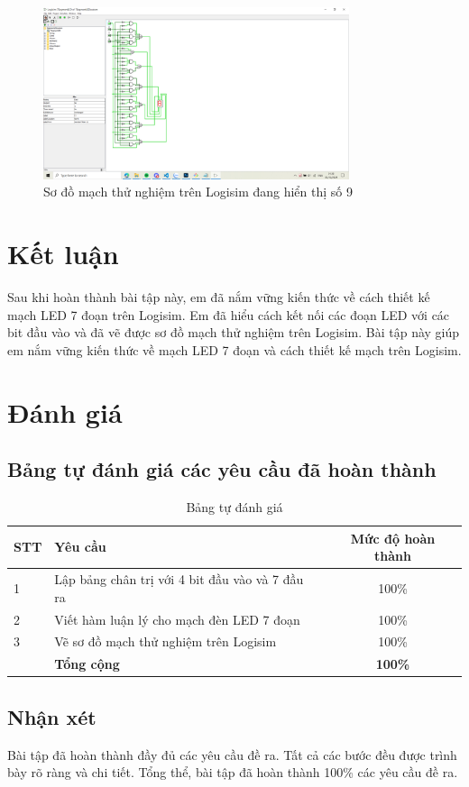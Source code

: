 \begin{figure}[H]
	\centering
	\includegraphics[width=0.8\textwidth]{images/9.PNG}
	\caption{Sơ đồ mạch thử nghiệm trên Logisim đang hiển thị số 9}
	\label{fig:circuitDesign}
\end{figure}

\section{Kết luận}

Sau khi hoàn thành bài tập này, em đã nắm vững kiến thức về cách thiết kế mạch LED 7 đoạn trên Logisim. Em đã hiểu cách kết nối các đoạn LED với các bit đầu vào và đã vẽ được sơ đồ mạch thử nghiệm trên Logisim. Bài tập này giúp em nắm vững kiến thức về mạch LED 7 đoạn và cách thiết kế mạch trên Logisim.

\section{Đánh giá}

\subsection{Bảng tự đánh giá các yêu cầu đã hoàn thành}

\begin{center}
	\begin{table}[H]
		\centering
		\caption{Bảng tự đánh giá}
		\renewcommand{\arraystretch}{1.4}
		\begin{tabular}{|l|p{}|c|}
			\hline
			\textbf{STT} & \textbf{Yêu cầu}                                & \textbf{Mức độ hoàn thành} \\ \hline
			1            & Lập bảng chân trị với 4 bit đầu vào và 7 đầu ra & 100\%                      \\ \hline
			2            & Viết hàm luận lý cho mạch đèn LED 7 đoạn        & 100\%                      \\ \hline
			3            & Vẽ sơ đồ mạch thử nghiệm trên Logisim           & 100\%                      \\ \hline

			             & \textbf{Tổng cộng}                              & \textbf{100\%}             \\ \hline
		\end{tabular}
		\label{tab:mytable}
	\end{table}
\end{center}

\subsection{Nhận xét}

Bài tập đã hoàn thành đầy đủ các yêu cầu đề ra. Tất cả các bước đều được trình bày rõ ràng và chi tiết. Tổng thể, bài tập đã hoàn thành 100\% các yêu cầu đề ra.